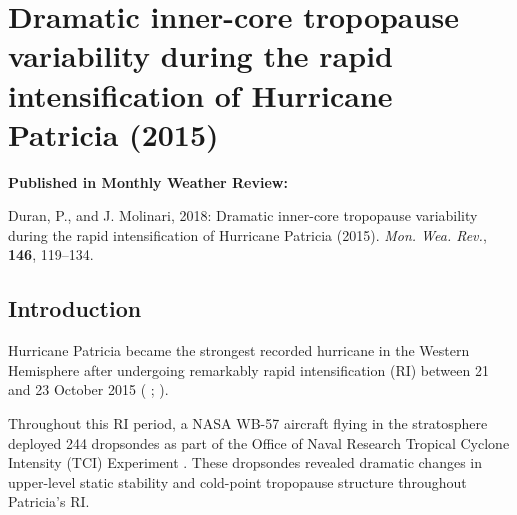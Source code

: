  
\chapter{Dramatic inner-core tropopause variability during the rapid intensification of {Hurricane Patricia} (2015)}
\label{chapter:patricia}
\resetfootnote %

\textbf{Published in Monthly Weather Review:}

\noindent Duran, P., and J. Molinari, 2018: Dramatic inner-core tropopause variability during the rapid intensification of Hurricane Patricia (2015). \textit{Mon. Wea. Rev.}, \textbf{146}, 119–134.

\section{Introduction}

Hurricane Patricia became the strongest recorded hurricane in the Western Hemisphere after undergoing remarkably rapid intensification (RI) between 21 and 23 October 2015 (\citeauthor{Kimberlainetal2016} \citeyear{Kimberlainetal2016}; \citeauthor{Rogersetal2017} \citeyear{Rogersetal2017}).

Throughout this RI period, a NASA WB-57 aircraft flying in the stratosphere deployed 244 dropsondes as part of the Office of Naval Research Tropical Cyclone Intensity (TCI) Experiment \cite{DoyleTCI}.
These dropsondes revealed dramatic changes in upper-level static stability and cold-point tropopause structure throughout Patricia’s RI.

